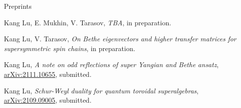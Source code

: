 \documentclass{resume} %
\begin{document}


\begin{rSection}{Preprints}
\begin{etaremune}[leftmargin=0cm]
\item Kang Lu, E. Mukhin, V. Tarasov, {\it TBA}, in preparation.

\item Kang Lu, V. Tarasov, {\it On Bethe eigenvectors and higher transfer matrices for supersymmetric spin
chains}, in preparation.

\item Kang Lu, {\it A note on odd reflections of super Yangian and Bethe ansatz}, \href{https://arxiv.org/abs/2111.10655}{arXiv:2111.10655}, submitted.

\item Kang Lu, {\it Schur-Weyl duality for quantum toroidal superalgebras}, \href{https://arxiv.org/abs/2109.09005}{arXiv:2109.09005}, submitted.


		
\end{etaremune}
\end{rSection}
\end{document}
